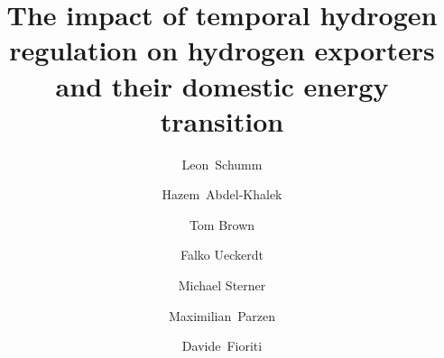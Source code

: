 \documentclass[5p,numafflabel]{elsarticle}
\begin{document}
\begin{frontmatter}

	\title{The impact of temporal hydrogen regulation on hydrogen exporters and their domestic energy transition}

    
	\author[oth,tub]{Leon~Schumm}
	\author[ieg,alu]{Hazem~Abdel-Khalek}
	\author[tub]{Tom Brown}
	\author[pik]{Falko Ueckerdt}
	\author[oth]{Michael Sterner}
	\author[uoe]{Maximilian~Parzen}
	\author[unipi]{Davide~Fioriti}


	\address[oth]{${}^1$ Research Center on Energy Transmission and Storage (FENES), Faculty of Electrical and Information Technology, University of Applied Sciences (OTH) Regensburg, Seybothstr. 2, 93053 Regensburg, Germany. \textit{* Corresponding author: leon1.schumm@oth-regensburg.de}}
	\address[tub]{Department of Digital Transformation in Energy Systems, Institute of Energy Technology, Technische Universität Berlin, Fakultät III, Einsteinufer 25 (TA 8), 10587 Berlin, Germany}
	\address[ieg]{Fraunhofer Research Institution for Energy Infrastructures and Geothermal Systems IEG, Gulbener Straße 23, 03046 Cottbus, Germany}
	\address[alu]{Albert-Ludwigs Universität Freiburg, Faculty of Environment and Natural Resources, Tennenbacher Str. 4, 79106 Freiburg im Breisgau, Germany}
	\address[pik]{Potsdam Institute for Climate Impact Research, Telegrafenberg, 14473 Potsdam, Germany}
	\address[uoe]{University of Edinburgh, Institute for Energy Systems, EH9 3DW Edinburgh, United Kingdom}
	\address[unipi]{University of Pisa, Department of Energy Systems, Territory and Construction Engineering, Largo Lucio Lazzarino, 56122 Pisa, Italy}
	\address[corrauth]{* Corresponding author. Email: leon1.schumm@oth-regensburg.de}

	\address{${}^{*}$ Corresponding author. Email: leon1.schumm@oth-regensburg.de}

	\begin{abstract}
		

\end{abstract}
\end{frontmatter}
\end{document}
